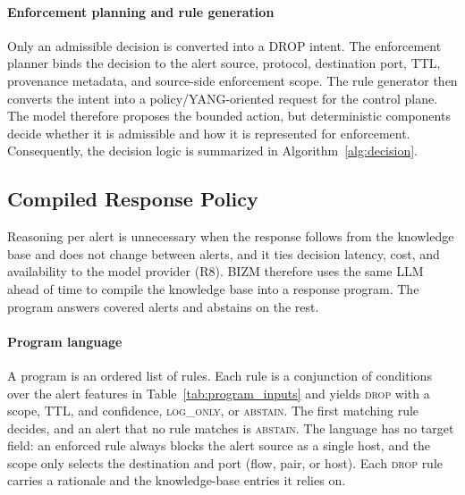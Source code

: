 \documentclass[final,5p]{elsarticle}
\begin{document}
\paragraph{Enforcement planning and rule generation}
Only an admissible decision is converted into a DROP intent. The enforcement planner binds the decision to the alert source, protocol, destination port, TTL, provenance metadata, and source-side enforcement scope. The rule generator then converts the intent into a policy/YANG-oriented request for the control plane. The model therefore proposes the bounded action, but deterministic components decide whether it is admissible and how it is represented for enforcement. Consequently, the decision logic is summarized in Algorithm~\ref{alg:decision}.

\subsection{Compiled Response Policy}
\label{sec:compiled_policy}

Reasoning per alert is unnecessary when the response follows from the knowledge base and does not change between alerts, and it ties decision latency, cost, and availability to the model provider (R8). BIZM therefore uses the same LLM ahead of time to compile the knowledge base into a response program. The program answers covered alerts and abstains on the rest.

\paragraph{Program language}
A program is an ordered list of rules. Each rule is a conjunction of conditions over the alert features in Table~\ref{tab:program_inputs} and yields \textsc{drop} with a scope, TTL, and confidence, \textsc{log\_only}, or \textsc{abstain}. The first matching rule decides, and an alert that no rule matches is \textsc{abstain}. The language has no target field: an enforced rule always blocks the alert source as a single host, and the scope only selects the destination and port (flow, pair, or host). Each \textsc{drop} rule carries a rationale and the knowledge-base entries it relies on.
\end{document}

